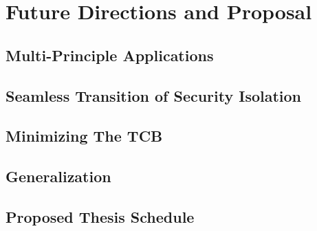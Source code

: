 \chapter{Future Directions and Proposal}

\section{Multi-Principle Applications}

\section{Seamless Transition of Security Isolation}

\section{Minimizing The TCB}

\section{Generalization}

\section{Proposed Thesis Schedule}